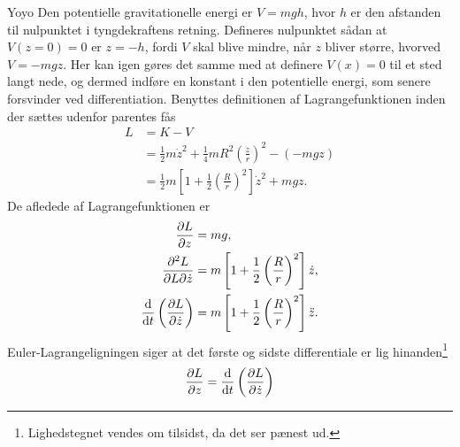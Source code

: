 \documentclass[crop=false, class=memoir]{standalone}
\begin{document}
\begin{opgave}[2]{Yoyo}
%
%
\opg Den potentielle gravitationelle energi er $V = mgh$, hvor $h$ er den afstanden til nulpunktet i tyngdekraftens retning. Defineres nulpunktet sådan at $V(z=0)=0$ er $z=-h$, fordi $V$ skal blive mindre, når $z$ bliver større, hvorved $V = -mgz$. Her kan igen gøres det samme med at definere $V(x) = 0$ til et sted langt nede, og dermed indføre en konstant i den potentielle energi, som senere forsvinder ved differentiation.
%
\opg Benyttes definitionen af Lagrangefunktionen inden der sættes udenfor parentes fås
%
\begin{align*}
	L &= K - V \\
	&= \frac{1}{2}m\dot{z}^2 + \frac{1}{4}mR^2\left(\frac{\dot{z}}{r}\right)^2 - (-mgz) \\
	&= \frac{1}{2}m\left[1 + \frac{1}{2}\left(\frac{R}{r}\right)^2\right]\dot{z}^2 + mgz.
\end{align*}
%
\opg De afledede af Lagrangefunktionen er
%
\begin{align*}
	\pdv{L}{z} &= mg,\\
	\pdv{L}{L}{\dot{z}} &= m\left[1 + \frac{1}{2}\left(\frac{R}{r}\right)^2\right]\dot{z}, \\
	\dv{}{t}\left(\pdv{L}{\dot{z}}\right) &= m\left[1 + \frac{1}{2}\left(\frac{R}{r}\right)^2\right]\ddot{z}.
\end{align*}
%
\opg Euler-Lagrangeligningen siger at det første og sidste differentiale er lig hinanden\footnote{Lighedstegnet vendes om tilsidst, da det ser pænest ud.}
%
\begin{align*}
	\pdv{L}{z} &= \el{z}\\

\end{align*}
\end{opgave}
\end{document}
